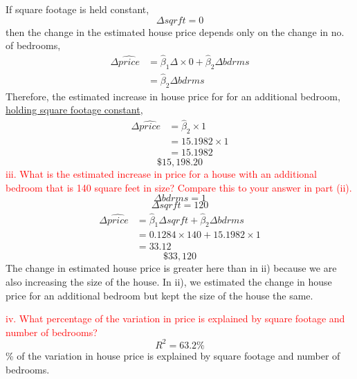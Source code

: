 \documentclass[12pt]{report}
\begin{document}
\noindent If square footage is held constant,
$$\Delta sqrft = 0$$
\noindent then the change in the estimated house price depends only on the change in no. of bedrooms,
\begin{align*}
	\Delta\widehat{price} &= \hat{\beta}_1\Delta \times 0 + \hat{\beta}_2\Delta bdrms \\
	&= \hat{\beta}_2\Delta bdrms
\end{align*}
\noindent Therefore, the estimated increase in house price for for an additional bedroom, \uline{holding square footage constant},
\begin{align*}
\Delta\widehat{price} &= \hat{\beta}_2 \times 1 \\
&= 15.1982 \times 1 \\
&= 15.1982
\end{align*}
$$\$15,198.20$$
\noindent \textcolor{red}
{
	iii. What is the estimated increase in price for a house with an additional bedroom that is 140 square feet in size? Compare this to your answer in part (ii).
}
$$\Delta bdrms = 1$$
$$\Delta sqrft = 120$$
\begin{align*}
\Delta\widehat{price} &= \hat{\beta}_1\Delta sqrft + \hat{\beta}_2\Delta bdrms \\
&= 0.1284 \times 140+15.1982 \times 1 \\
&= 33.12
\end{align*}
$$\$33,120$$
\noindent The change in estimated house price is greater here than in ii) because we are also increasing the size of the house. In ii), we estimated the change in house price for an additional bedroom but kept the size of the house the same.

\noindent \textcolor{red}
{
	iv. What percentage of the variation in price is explained by square footage and number of bedrooms?
}
$$R^2 = 63.2\%$$
\% of the variation in house price is explained by square footage and number of bedrooms.
\end{document}
